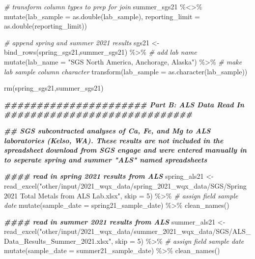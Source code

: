 \documentclass[
]{book}
\newenvironment{Shaded}{\begin{snugshade}}{\end{snugshade}}
\newcommand{\AttributeTok}[1]{\textcolor[rgb]{0.77,0.63,0.00}{#1}}
\newcommand{\CommentTok}[1]{\textcolor[rgb]{0.56,0.35,0.01}{\textit{#1}}}
\newcommand{\DecValTok}[1]{\textcolor[rgb]{0.00,0.00,0.81}{#1}}
\newcommand{\DocumentationTok}[1]{\textcolor[rgb]{0.56,0.35,0.01}{\textbf{\textit{#1}}}}
\newcommand{\FunctionTok}[1]{\textcolor[rgb]{0.00,0.00,0.00}{#1}}
\newcommand{\NormalTok}[1]{#1}
\newcommand{\OtherTok}[1]{\textcolor[rgb]{0.56,0.35,0.01}{#1}}
\newcommand{\SpecialCharTok}[1]{\textcolor[rgb]{0.00,0.00,0.00}{#1}}
\newcommand{\StringTok}[1]{\textcolor[rgb]{0.31,0.60,0.02}{#1}}
\begin{document}
\begin{Shaded}
\begin{Highlighting}[]
\CommentTok{\# transform column types to prep for join}
\NormalTok{summer\_sgs21 }\SpecialCharTok{\%\textless{}\textgreater{}\%}
  \FunctionTok{mutate}\NormalTok{(}\AttributeTok{lab\_sample =} \FunctionTok{as.double}\NormalTok{(lab\_sample),}
         \AttributeTok{reporting\_limit =} \FunctionTok{as.double}\NormalTok{(reporting\_limit))}

\CommentTok{\# append spring and summer 2021 results}
\NormalTok{sgs21 }\OtherTok{\textless{}{-}} \FunctionTok{bind\_rows}\NormalTok{(spring\_sgs21,summer\_sgs21) }\SpecialCharTok{\%\textgreater{}\%}
  \CommentTok{\# add lab name}
  \FunctionTok{mutate}\NormalTok{(}\AttributeTok{lab\_name =} \StringTok{"SGS North America, Anchorage, Alaska"}\NormalTok{) }\SpecialCharTok{\%\textgreater{}\%}
  \CommentTok{\# make lab sample column character}
  \FunctionTok{transform}\NormalTok{(}\AttributeTok{lab\_sample =} \FunctionTok{as.character}\NormalTok{(lab\_sample))}

\FunctionTok{rm}\NormalTok{(spring\_sgs21,summer\_sgs21)}






\DocumentationTok{\#\#\#\#\#\#\#\#\#\#\#\#\#\#\#\#\#\#\#\#\#\# Part B: ALS Data Read In \#\#\#\#\#\#\#\#\#\#\#\#\#\#\#\#\#\#\#\#\#\#\#\#\#\#\#\#\#}

\DocumentationTok{\#\# SGS subcontracted analyses of Ca, Fe, and Mg to ALS laboratories (Kelso, WA). These results are not included in the spreadsheet download from SGS engage and were entered manually in to seperate spring and summer "ALS" named spreadsheets}

\DocumentationTok{\#\#\#\# read in spring 2021 results from ALS }
\NormalTok{spring\_als21 }\OtherTok{\textless{}{-}} \FunctionTok{read\_excel}\NormalTok{(}\StringTok{"other/input/2021\_wqx\_data/spring\_2021\_wqx\_data/SGS/Spring 2021 Total Metals from ALS Lab.xlsx"}\NormalTok{, }\AttributeTok{skip =} \DecValTok{5}\NormalTok{) }\SpecialCharTok{\%\textgreater{}\%}
  \CommentTok{\# assign field sample date}
  \FunctionTok{mutate}\NormalTok{(}\AttributeTok{sample\_date =}\NormalTok{ spring21\_sample\_date) }\SpecialCharTok{\%\textgreater{}\%}
  \FunctionTok{clean\_names}\NormalTok{()}

\DocumentationTok{\#\#\#\# read in summer 2021 results from ALS }
\NormalTok{summer\_als21 }\OtherTok{\textless{}{-}} \FunctionTok{read\_excel}\NormalTok{(}\StringTok{"other/input/2021\_wqx\_data/summer\_2021\_wqx\_data/SGS/ALS\_Data\_Results\_Summer\_2021.xlsx"}\NormalTok{, }\AttributeTok{skip =} \DecValTok{5}\NormalTok{) }\SpecialCharTok{\%\textgreater{}\%}
  \CommentTok{\# assign field sample date}
  \FunctionTok{mutate}\NormalTok{(}\AttributeTok{sample\_date =}\NormalTok{ summer21\_sample\_date) }\SpecialCharTok{\%\textgreater{}\%}
  \FunctionTok{clean\_names}\NormalTok{()}


\end{Highlighting}
\end{Shaded}
\end{document}
